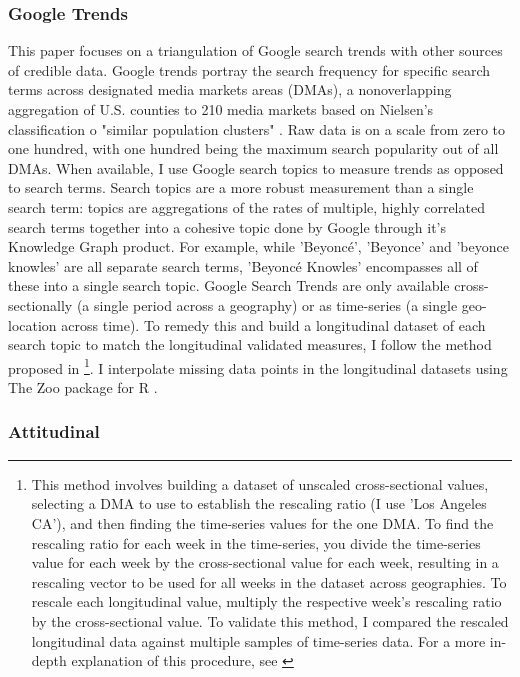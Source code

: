 \subsubsection{Google Trends}
This paper focuses on a triangulation of Google search trends
\citep{googletrends} with other sources of credible data. Google trends portray
the search frequency for specific search terms across designated media markets
areas (DMAs), a nonoverlapping aggregation of U.S. counties to 210 media markets
based on Nielsen's classification o "similar population clusters"
\citep{dma_key}. Raw data is on a scale from zero to one hundred, with one
hundred being the maximum search popularity out of all DMAs. When available, I
use Google search topics to measure trends as opposed to search terms. Search
topics are a more robust measurement than a single search term: topics are
aggregations of the rates of multiple, highly correlated search terms together
into a cohesive topic done by Google through it's Knowledge Graph product. For
example, while 'Beyoncé', 'Beyonce' and 'beyonce knowles' are all separate
search terms, 'Beyoncé Knowles' encompasses all of these into a single search
topic. Google Search Trends are only available cross-sectionally (a single
period across a geography) or as time-series (a single geo-location across
time). To remedy this and build a longitudinal dataset of each search topic to
match the longitudinal validated measures, I follow the method proposed in
\citet[][p. 5]{park_etal}\footnote{This method involves building a dataset of
unscaled cross-sectional values, selecting a DMA to use to establish the
rescaling ratio (I use 'Los Angeles CA'), and then finding the time-series
values for the one DMA. To find the rescaling ratio for each week in the
time-series, you divide the time-series value for each week by the
cross-sectional value for each week, resulting in a rescaling vector to be used
for all weeks in the dataset across geographies. To rescale each longitudinal
value, multiply the respective week's rescaling ratio by the cross-sectional
value. To validate this method, I compared the rescaled longitudinal data
against multiple samples of time-series data. For a more in-depth explanation of
this procedure, see \citet[p. 5]{park_etal}}. I interpolate missing data points
in the longitudinal datasets using The Zoo package for R \citep{zoo}.

\subsubsection{Attitudinal}


